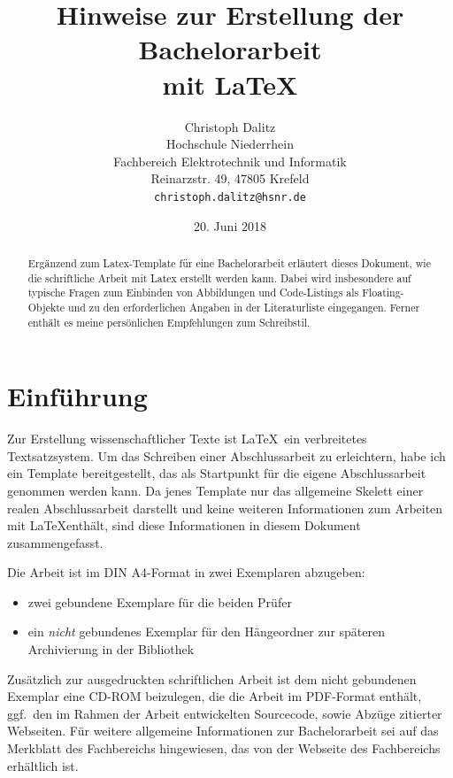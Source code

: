 \documentclass[12pt]{article}
\title{\vspace*{-10mm}Hinweise zur Erstellung der Bachelorarbeit\\ mit \LaTeX}
\author{
Christoph Dalitz\\
Hochschule Niederrhein\\
Fachbereich Elektrotechnik und Informatik\\
Reinarzstr. 49, 47805 Krefeld\\
{\tt christoph.dalitz{@}hsnr.de}
}
\date{20. Juni 2018}
\begin{document}
\maketitle

\begin{abstract}
Ergänzend zum Latex-Template für eine Bachelorarbeit erläutert
dieses Dokument, wie die schriftliche Arbeit mit Latex erstellt
werden kann. Dabei wird insbesondere auf typische Fragen zum
Einbinden von Abbildungen und Code-Listings als Floating-Objekte
und zu den erforderlichen Angaben in der Literaturliste
eingegangen. Ferner enthält es meine persönlichen Empfehlungen
zum Schreibstil.
\end{abstract}

\renewcommand{\labelenumi}{\alph{enumi})} 



\section{Einführung}
Zur Erstellung wissenschaftlicher Texte ist \LaTeX\ ein verbreitetes
Textsatzsystem. Um das Schreiben einer Abschlussarbeit zu erleichtern,
habe ich ein Template bereitgestellt, das als Startpunkt
für die eigene Abschlussarbeit genommen werden kann. Da jenes Template
nur das allgemeine Skelett einer realen Abschlussarbeit darstellt und
keine weiteren Informationen zum Arbeiten mit \LaTeX enthält, sind diese
Informationen in diesem Dokument zusammengefasst.

Die Arbeit ist im DIN A4-Format in zwei Exemplaren abzugeben:
\begin{itemize}
\item zwei gebundene Exemplare für die beiden Prüfer
\item ein {\em nicht} gebundenes Exemplar für den Hängeordner zur späteren
  Archivierung in der Bibliothek
\end{itemize}
Zusätzlich zur ausgedruckten schriftlichen Arbeit ist dem nicht gebundenen
Exemplar eine CD-ROM beizulegen,
die die Arbeit im PDF-Format enthält, ggf.~den im Rahmen der Arbeit 
entwickelten Sourcecode, sowie Abzüge zitierter Webseiten. Für weitere
allgemeine Informationen zur Bachelorarbeit sei auf das Merkblatt
des Fachbereichs hingewiesen, das von der Webseite des Fachbereichs
erhältlich ist.
\end{document}
